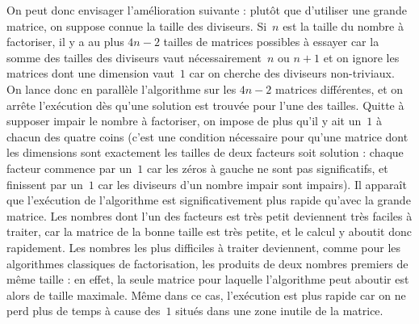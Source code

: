 \documentclass[11pt, openany, a4paper]{article}
\begin{document}
On peut donc envisager l'amélioration suivante : plutôt que d'utiliser une grande matrice, on suppose connue la taille des diviseurs. Si~$n$ est la taille du nombre à factoriser, il y a au plus $4n-2$ tailles de matrices possibles à essayer car la somme des tailles des diviseurs vaut nécessairement~$n$ ou $n+1$ et on ignore les matrices dont une dimension vaut~$1$ car on cherche des diviseurs non-triviaux. On lance donc en parallèle l'algorithme sur les $4n-2$ matrices différentes, et on arrête l'exécution dès qu'une solution est trouvée pour l'une des tailles. Quitte à supposer impair le nombre à factoriser, on impose de plus qu'il y ait un~$1$ à chacun des quatre coins (c'est une condition nécessaire pour qu'une matrice dont les dimensions sont exactement les tailles de deux facteurs soit solution : chaque facteur commence par un~$1$ car les zéros à gauche ne sont pas significatifs, et finissent par un~$1$ car les diviseurs d'un nombre impair sont impairs). 
Il apparaît que l'exécution de l'algorithme est significativement plus rapide qu'avec la grande matrice. Les nombres dont l'un des facteurs est très petit deviennent très faciles à traiter, car la matrice de la bonne taille est très petite, et le calcul y aboutit donc rapidement. Les nombres les plus difficiles à traiter deviennent, comme pour les algorithmes classiques de factorisation, les produits de deux nombres premiers de même taille : en effet, la seule matrice pour laquelle l'algorithme peut aboutir est alors de taille maximale. Même dans ce cas, l'exécution est plus rapide car on ne perd plus de temps à cause des~$1$ situés dans une zone inutile de la matrice. %
\end{document}
